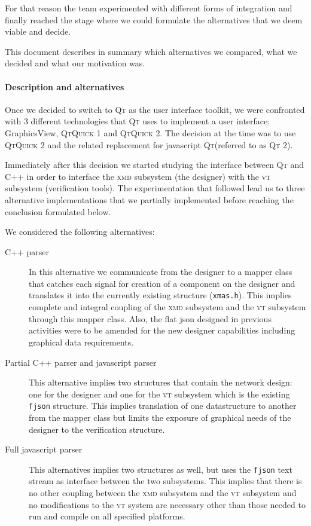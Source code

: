 \documentclass[a4paper,11pt,final]{article}
\newcommand{\w}[1]{\texttt{#1}\xspace}
\newcommand{\xmd}{\textsc{xmd}\xspace}%
\newcommand{\vt}{\textsc{vt}\xspace}%
\newcommand{\qt}{\textsc{Qt}\xspace}%
\newcommand{\qtquick}{\textsc{QtQuick}\xspace}%
\newcommand{\qml}{\textsc{Qt}\xspace}%
\newcommand{\cpp}{\textsc{C++}\xspace}%
\begin{document}
For that reason the team experimented with different forms of integration
and finally reached the stage where we could formulate the alternatives
that we deem viable and decide.

This document describes in summary which alternatives we compared, what
we decided and what our motivation was. 

\paragraph{Description and alternatives}
Once we decided to switch to \qt as the user interface toolkit, we were
confronted with 3 different technologies that \qt uses to
implement a user interface: GraphicsView, \qtquick1 and \qtquick2. The 
decision at the time was to use \qtquick2 and the related replacement
for javascript \qml (referred to as \qml2). 

Immediately after this decision we started studying the interface between 
\qml and \cpp in order to interface the \xmd subsystem (the designer) with
the \vt subsystem (verification tools). The experimentation that followed
lead us to three alternative implementations that we partially implemented
before reaching the conclusion formulated below.

We considered the following alternatives:

\begin{description}
	\item[\cpp parser] In this alternative we communicate from
	the designer to a mapper class that catches each signal for creation
	of a component on the designer and translates it into the currently
	existing structure (\w{xmas.h}). This implies complete and integral
	coupling of the \xmd subsystem and the \vt subsystem through this
	mapper class. Also, the flat json designed in previous activities were
	to be amended for the new designer capabilities including graphical
	data requirements.
	
	\item[Partial \cpp parser and javascript parser] This alternative
	implies two structures that contain the network design: one for
	the designer and one for the \vt subsystem which is the existing 
	\w{fjson} structure. This implies translation of one datastructure 
	to another from the mapper class but limits the exposure of graphical 
	needs of the designer to the verification structure.
	
	\item[Full javascript parser] This alternatives implies two structures
	as well, but uses the \w{fjson} text stream as interface between the
	two subsystems. This implies that there is no other coupling between
	the \xmd subsystem and the \vt subsystem and no modifications to the
	\vt system are necessary other than those needed to run and compile on
	all specified platforms. 
\end{description}
\end{document}
